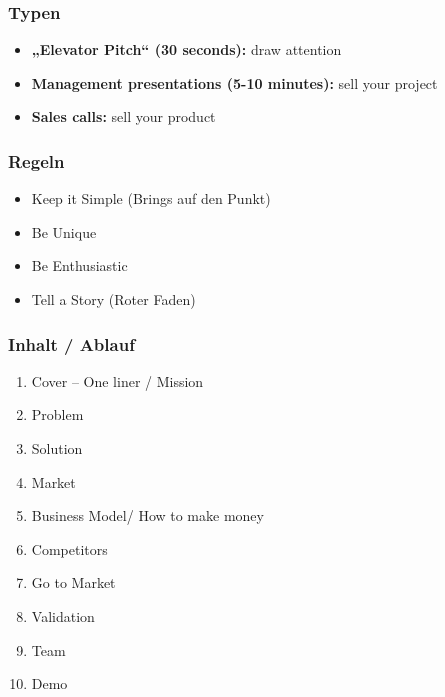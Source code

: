 \subsubsection{Typen}
\begin{itemize}
	\item \textbf{„Elevator Pitch“ (30 seconds):} draw attention
	\item \textbf{Management presentations (5-10 minutes):} sell your project
	\item \textbf{Sales calls:} sell your product
\end{itemize}

\subsubsection{Regeln}
\begin{itemize}
	\item Keep it Simple (Brings auf den Punkt)
	\item Be Unique
	\item Be Enthusiastic
	\item Tell a Story (Roter Faden)
\end{itemize}

\subsubsection{Inhalt / Ablauf}
\begin{enumerate}
	\item Cover – One liner / Mission
	\item Problem
	\item Solution
	\item Market
	\item Business Model/ How to make money
	\item Competitors
	\item Go to Market
	\item Validation
	\item Team
	\item Demo	
\end{enumerate}
